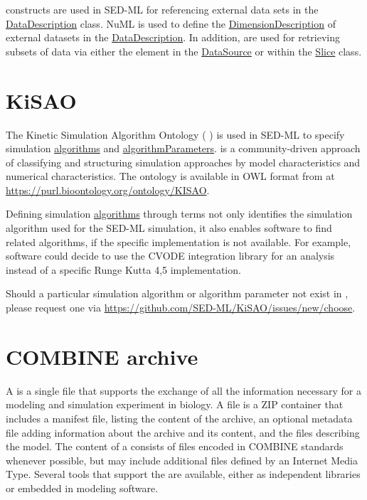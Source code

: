  constructs are used in SED-ML for referencing external data sets in the \hyperref[class:dataDescription]{DataDescription} class. NuML is used to define the \hyperref[sec:dimensionDescription]{DimensionDescription} of external datasets in the \hyperref[class:dataDescription]{DataDescription}. In addition, \hyperref[type:numlsid]{} are used for retrieving subsets of data via either the \hyperref[sec:indexSet]{} element in the \hyperref[class:dataSource]{DataSource} or within the \hyperref[class:slice]{Slice} class.

\section{KiSAO}
\label{sec:kisao}
The Kinetic Simulation Algorithm Ontology ( \citep{CWK+10}) is used in SED-ML to specify simulation \hyperref[class:algorithm]{algorithms} and \hyperref[class:algorithmParameter]{algorithmParameters}.  is a community-driven approach of classifying and structuring simulation approaches by model characteristics and numerical characteristics. The ontology is available in OWL format from  at \url{https://purl.bioontology.org/ontology/KISAO}. 

Defining simulation \hyperref[class:algorithm]{algorithms} through  terms not only identifies the simulation algorithm used for the SED-ML simulation, it also enables software to find related algorithms, if the specific implementation is not available. For example, software could decide to use the CVODE integration library for an analysis instead of a specific Runge Kutta 4,5 implementation. 

Should a particular simulation algorithm or algorithm parameter not exist in , please request one via \url{https://github.com/SED-ML/KiSAO/issues/new/choose}.

\section{COMBINE archive}
\label{sec:archive}

A  \citep{Bergmann2014} is a single file that supports the exchange of all the information necessary for a modeling and simulation experiment in biology. A  file is a ZIP container that includes a manifest file, listing the content of the archive, an optional metadata file adding information about the archive and its content, and the files describing the model. The content of a  consists of files encoded in COMBINE standards whenever possible, but may include additional files defined by an Internet Media Type. Several tools that support the  are available, either as independent libraries or embedded in modeling software.

